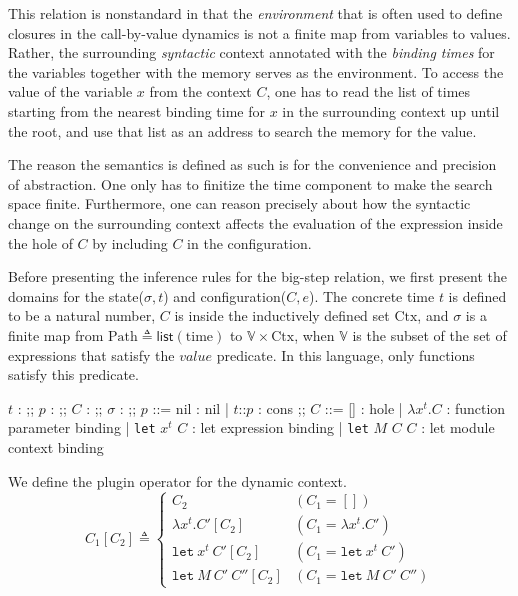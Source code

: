 \documentclass{article}
\newcommand*{\cons}{::}
\newcommand*{\Path}{\text{Path}}
\newcommand*{\Ctx}{\text{Ctx}}
\newcommand*{\fin}[2]{{#1}\xrightarrow{\text{fin}}{#2}}
\begin{document}
This relation is nonstandard in that the \textit{environment} that is often used to define closures in the call-by-value dynamics is not a finite map from variables to values.
Rather, the surrounding \textit{syntactic} context annotated with the \textit{binding times} for the variables together with the memory serves as the environment.
To access the value of the variable $x$ from the context $C$, one has to read the list of times starting from the nearest binding time for $x$ in the surrounding context up until the root, and use that list as an address to search the memory for the value.

The reason the semantics is defined as such is for the convenience and precision of abstraction.
One only has to finitize the time component to make the search space finite.
Furthermore, one can reason precisely about how the syntactic change on the surrounding context affects the evaluation of the expression inside the hole of $C$ by including $C$ in the configuration.

Before presenting the inference rules for the big-step relation, we first present the domains for the state($\sigma, t$) and configuration($C, e$).
The concrete time $t$ is defined to be a natural number, $C$ is inside the inductively defined set $\Ctx$,
and $\sigma$ is a finite map from $\Path\triangleq\mathsf{list}(\text{time})$ to $\mathbb{V}\times\Ctx$, when $\mathbb{V}$ is the subset of the set of expressions that satisfy the $\textit{value}$ predicate.
In this language, only functions satisfy this predicate.

\begin{bnfgrammar}
  $t$ : \in {}
  ;;
  $p$ : \in \Path
  ;;
  $C$ : \in \Ctx
  ;;
  $\sigma$ : \in \fin{\Path}{\mathbb{V}\times\mathbb{C}}
  ;;
  $p$ ::= \textsf{nil} : nil
  | $t$\cons$p$ : cons
  ;;
  $C$ ::= [] : hole
  | $\lambda x^{t}.C$ : function parameter binding
  | \texttt{let} $x^{t}$ $C$ : let expression binding
  | \texttt{let} $M$ $C$ $C$ : let module context binding
\end{bnfgrammar}

We define the plugin operator for the dynamic context.
\[
  C_{1}[C_{2}]\triangleq
  \begin{cases}
    C_{2}                           & (C_{1}=[])                       \\
    \lambda x^{t}.C'[C_{2}]         & (C_{1}=\lambda x^{t}.C')         \\
    \mathtt{let}\:x^{t}\:C'[C_{2}]  & (C_{1}=\mathtt{let}\:x^{t}\:C')  \\
    \mathtt{let}\:M\:C'\:C''[C_{2}] & (C_{1}=\mathtt{let}\:M\:C'\:C'')
  \end{cases}
\]
\end{document}
